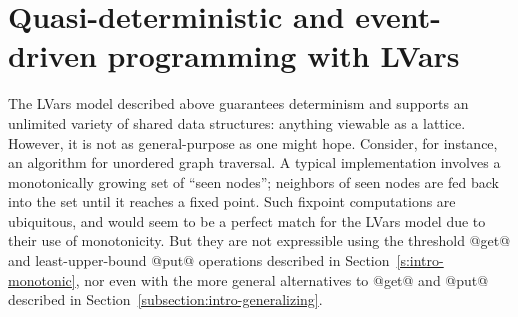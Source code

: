 
\section{Quasi-deterministic and event-driven programming with LVars}\label{s:intro-quasi}

The LVars model described above guarantees determinism and supports an
unlimited variety of shared data structures: anything viewable as a
lattice.  However, it is not as general-purpose as one might hope.
Consider, for instance, an algorithm for unordered graph traversal.  A
typical implementation involves a monotonically growing set of ``seen
nodes''; neighbors of seen nodes are fed back into the set until it
reaches a fixed point.  Such fixpoint computations are ubiquitous, and
would seem to be a perfect match for the LVars model due to their use
of monotonicity.  But they are not expressible using the threshold
@get@ and least-upper-bound @put@ operations described in
Section~\ref{s:intro-monotonic}, nor even with the more general
alternatives to @get@ and @put@ described in
Section~\ref{subsection:intro-generalizing}.

